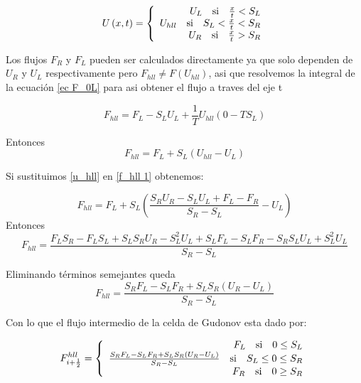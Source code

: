 \documentclass[12pt,a4paper]{book}
\begin{document}
\begin{equation}
U \left(x,t \right) = 
\left\lbrace
\begin{array}{rr}
U_L \quad \textup{si} \quad \frac{x}{t}< S_L  \\
U_{hll} \quad \textup{si} \quad S_L< \frac{x}{t} <S_R \\
U_R \quad \textup{si} \quad  \frac{x}{t} > S_R
\end{array}
\right.
\end{equation}

Los flujos $F_R$ y $F_L$ pueden ser calculados directamente ya que solo dependen de $U_R$ y $U_L$ respectivamente pero $F_{hll} \neq F \left( U_{hll} \right)$, asi que resolvemos la integral de la ecuación \ref{ec F_0L} para asi obtener el flujo a traves del eje t

\begin{equation*}
F_{hll} = F_L -S_L U_L+ \frac{1}{T}U_{hll}\left(0- TS_L\right)
\end{equation*}

Entonces
\begin{equation}\label{f_hll 1}
F_{hll} = F_L +S_L \left( U_{hll} -U_L \right)
\end{equation}

Si sustituimos \ref{u_hll} en \ref{f_hll 1} obtenemos:

\begin{equation*}
F_{hll} = F_L +S_L \left( \frac{S_R U_R - S_L U_L + F_L - F_R}{S_R - S_L} -U_L \right)
\end{equation*}
Entonces
\begin{equation*}
F_{hll} = \frac{F_L S_R -F_L S_L+S_L S_R U_R-S_L^2 U_L+S_L  F_L- S_L F_R-S_R S_L U_L + S_L^2 U_L}{S_R-S_L}
\end{equation*}

Eliminando términos semejantes queda
\begin{equation}
F_{hll} = \frac{S_R F_L -S_L F_R + S_L S_R \left(U_R-U_L \right)}{S_R -S_L}
\end{equation}

Con lo que el flujo intermedio de la celda de Gudonov esta dado por:

\begin{equation} \label{fluxesHLL}
F_{i+\frac{1}{2}}^{hll} = 
\left\lbrace
\begin{array}{rr}
F_L \quad \textup{si} \quad 0 \leq S_L  \\
\frac{S_R F_L -S_L F_R + S_L S_R \left(U_R-U_L \right)}{S_R -S_L} \quad \textup{si} \quad S_L \leq 0 \leq S_R \\
F_R \quad \textup{si} \quad  0 \geq  S_R
\end{array}
\right.
\end{equation}
\end{document}
